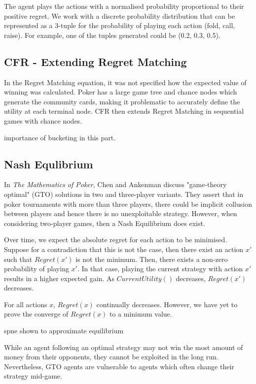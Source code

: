 \documentclass{article}
\begin{document}
The agent plays the actions with a normalised probability proportional to their positive regret. We work with a discrete probability distribution that can be represented as a 3-tuple for the probability of playing each action (fold, call, raise). For example, one of the tuples generated could be (0.2, 0.3, 0.5).

\subsection{CFR - Extending Regret Matching}

In the Regret Matching equation, it was not specified how the expected value of winning was calculated. Poker has a large game tree and chance nodes which generate the community cards, making it problematic to accurately define the utility at each terminal node. CFR then extends Regret Matching in sequential games with chance nodes.

importance of bucketing in this part.

\subsection{Nash Equlibrium}

In \textit{The Mathematics of Poker}, Chen and Ankenman discuss "game-theory optimal" (GTO) solutions in two and three-player variants. They assert that in poker tournaments with more than three players, there could be implicit collusion between players and hence there is no unexploitable strategy. However, when considering two-player games, then a Nash Equilibrium does exist. 

Over time, we expect the absolute regret for each action to be minimised. Suppose for a contradiction that this is not the case, then there exist an action $x'$ such that $Regret(x')$ is not the minimum. Then, there exists a non-zero probability of playing $x'$. In that case, playing the current strategy with action $x'$ results in a higher expected gain. As $CurrentUtility()$ decreases, $Regret(x')$ decreases.

For all actions $x$, $Regret(x)$ continually decreases. However, we have yet to prove the converge of $Regret(x)$ to a minimum value.

spne shown to approximate equilibrium

While an agent following an optimal strategy may not win the most amount of money from their opponents, they cannot be exploited in the long run. Nevertheless, GTO agents are vulnerable to agents which often change their strategy mid-game.
\end{document}
